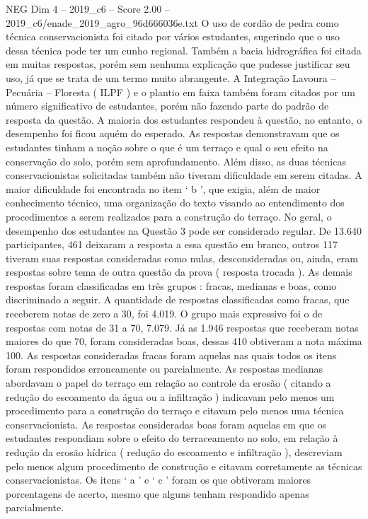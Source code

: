 \begin{textsample}{NEG Dim 4 – 2019\_c6 – Score 2.00 – 2019\_c6/enade\_2019\_agro\_96d666036e.txt}
O uso de cordão de pedra como técnica conservacionista foi citado por vários estudantes, sugerindo que o uso dessa técnica pode ter um cunho regional.
Também a bacia hidrográfica foi citada em muitas respostas, porém sem nenhuma explicação que pudesse justificar seu uso, já que se trata de um termo muito abrangente.
A Integração Lavoura – Pecuária – Floresta ( ILPF ) e o plantio em faixa também foram citados por um número significativo de estudantes, porém não fazendo parte do padrão de resposta da questão.
A maioria dos estudantes respondeu à questão, no entanto, o desempenho foi ficou aquém do esperado.
As respostas demonstravam que os estudantes tinham a noção sobre o que é um terraço e qual o seu efeito na conservação do solo, porém sem aprofundamento.
Além disso, as duas técnicas conservacionistas solicitadas também não tiveram dificuldade em serem citadas.
A maior dificuldade foi encontrada no item ‘ b ’, que exigia, além de maior conhecimento técnico, uma organização do texto visando ao entendimento dos procedimentos a serem realizados para a construção do terraço.
No geral, o desempenho dos estudantes na Questão 3 pode ser considerado regular.
De 13.640 participantes, 461 deixaram a resposta a essa questão em branco, outros 117 tiveram suas respostas consideradas como nulas, desconsideradas ou, ainda, eram respostas sobre tema de outra questão da prova ( resposta trocada ).
As demais respostas foram classificadas em três grupos : fracas, medianas e boas, como discriminado a seguir.
A quantidade de respostas classificadas como fracas, que receberem notas de zero a 30, foi 4.019.
O grupo mais expressivo foi o de respostas com notas de 31 a 70, 7.079.
Já as 1.946 respostas que receberam notas maiores do que 70, foram consideradas boas, dessas 410 obtiveram a nota máxima 100.
As respostas consideradas fracas foram aquelas nas quais todos os itens foram respondidos erroneamente ou parcialmente.
As respostas medianas abordavam o papel do terraço em relação ao controle da erosão ( citando a redução do escoamento da água ou a infiltração ) indicavam pelo menos um procedimento para a construção do terraço e citavam pelo menos uma técnica conservacionista.
As respostas consideradas boas foram aquelas em que os estudantes respondiam sobre o efeito do terraceamento no solo, em relação à redução da erosão hídrica ( redução do escoamento e infiltração ), descreviam pelo menos algum procedimento de construção e citavam corretamente as técnicas conservacionistas.
Os itens ‘ a ’ e ‘ c ’ foram os que obtiveram maiores porcentagens de acerto, mesmo que alguns tenham respondido apenas parcialmente.

\end{textsample}
